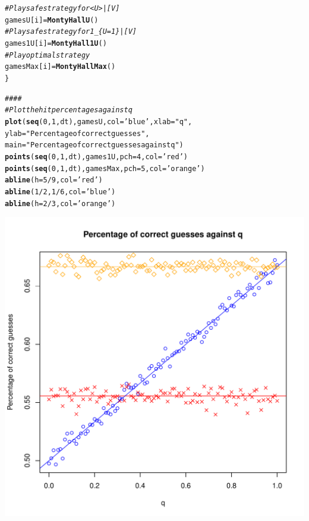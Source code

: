 \documentclass{article}\usepackage[]{graphicx}\usepackage[]{color}
\makeatletter
\def\maxwidth{ %
  \ifdim\Gin@nat@width>\linewidth
    \linewidth
  \else
    \Gin@nat@width
  \fi
}
\newcommand{\hlnum}[1]{\textcolor[rgb]{0.686,0.059,0.569}{#1}}%
\newcommand{\hlstr}[1]{\textcolor[rgb]{0.192,0.494,0.8}{#1}}%
\newcommand{\hlcom}[1]{\textcolor[rgb]{0.678,0.584,0.686}{\textit{#1}}}%
\newcommand{\hlopt}[1]{\textcolor[rgb]{0,0,0}{#1}}%
\newcommand{\hlstd}[1]{\textcolor[rgb]{0.345,0.345,0.345}{#1}}%
\newcommand{\hlkwb}[1]{\textcolor[rgb]{0.69,0.353,0.396}{#1}}%
\newcommand{\hlkwc}[1]{\textcolor[rgb]{0.333,0.667,0.333}{#1}}%
\newcommand{\hlkwd}[1]{\textcolor[rgb]{0.737,0.353,0.396}{\textbf{#1}}}%
\newenvironment{kframe}{%
 \def\at@end@of@kframe{}%
 \ifinner\ifhmode%
  \def\at@end@of@kframe{\end{minipage}}%
  \begin{minipage}{\columnwidth}%
 \fi\fi%
 \def\FrameCommand##1{\hskip\@totalleftmargin \hskip-\fboxsep
 \colorbox{shadecolor}{##1}\hskip-\fboxsep
     \hskip-\linewidth \hskip-\@totalleftmargin \hskip\columnwidth}%
 \MakeFramed {\advance\hsize-\width
   \@totalleftmargin\z@ \linewidth\hsize
   \@setminipage}}%
 {\par\unskip\endMakeFramed%
 \at@end@of@kframe}
\newenvironment{knitrout}{}{} %
\makeatother
\begin{document}
\begin{knitrout}
\begin{kframe}
\begin{alltt}
  \hlcom{# Play safe strategy for <U>|[V]}
  \hlstd{gamesU[i]} \hlkwb{=} \hlkwd{MontyHallU}\hlstd{()}
  \hlcom{# Play safe strategy for 1_\{U=1\}|[V]}
  \hlstd{games1U[i]} \hlkwb{=} \hlkwd{MontyHall1U}\hlstd{()}
  \hlcom{# Play optimal strategy}
  \hlstd{gamesMax[i]} \hlkwb{=} \hlkwd{MontyHallMax}\hlstd{()}
\hlstd{\}}

\hlcom{####}
\hlcom{# Plot the hit percentages against q}
\hlkwd{plot}\hlstd{(}\hlkwd{seq}\hlstd{(}\hlnum{0}\hlstd{,}\hlnum{1}\hlstd{,dt), gamesU,} \hlkwc{col}\hlstd{=}\hlstr{'blue'}\hlstd{,} \hlkwc{xlab}\hlstd{=}\hlstr{"q"}\hlstd{,}
     \hlkwc{ylab}\hlstd{=}\hlstr{"Percentage of correct guesses"}\hlstd{,}
     \hlkwc{main}\hlstd{=}\hlstr{"Percentage of correct guesses against q"}\hlstd{)}
\hlkwd{points}\hlstd{(}\hlkwd{seq}\hlstd{(}\hlnum{0}\hlstd{,}\hlnum{1}\hlstd{,dt), games1U,} \hlkwc{pch}\hlstd{=}\hlnum{4}\hlstd{,} \hlkwc{col}\hlstd{=}\hlstr{'red'}\hlstd{)}
\hlkwd{points}\hlstd{(}\hlkwd{seq}\hlstd{(}\hlnum{0}\hlstd{,}\hlnum{1}\hlstd{,dt), gamesMax,} \hlkwc{pch}\hlstd{=}\hlnum{5}\hlstd{,} \hlkwc{col}\hlstd{=}\hlstr{'orange'}\hlstd{)}
\hlkwd{abline}\hlstd{(}\hlkwc{h}\hlstd{=}\hlnum{5}\hlopt{/}\hlnum{9}\hlstd{,} \hlkwc{col}\hlstd{=}\hlstr{'red'}\hlstd{)}
\hlkwd{abline}\hlstd{(}\hlnum{1}\hlopt{/}\hlnum{2}\hlstd{,}\hlnum{1}\hlopt{/}\hlnum{6}\hlstd{,} \hlkwc{col}\hlstd{=}\hlstr{'blue'}\hlstd{)}
\hlkwd{abline}\hlstd{(}\hlkwc{h}\hlstd{=}\hlnum{2}\hlopt{/}\hlnum{3}\hlstd{,} \hlkwc{col}\hlstd{=}\hlstr{'orange'}\hlstd{)}
\end{alltt}
\end{kframe}
\includegraphics[width=\maxwidth]{figure/unnamed-chunk-1-1} 

\end{knitrout}
\end{document}
